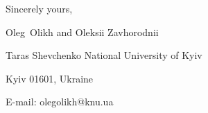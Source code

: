 \documentclass[preprint]{elsarticle}
\begin{document}
%


\vspace{3mm}

Sincerely yours,

Oleg~Olikh and Oleksii Zavhorodnii


Taras Shevchenko National University of Kyiv


Kyiv 01601, Ukraine

E-mail: olegolikh@knu.ua
\end{document}
